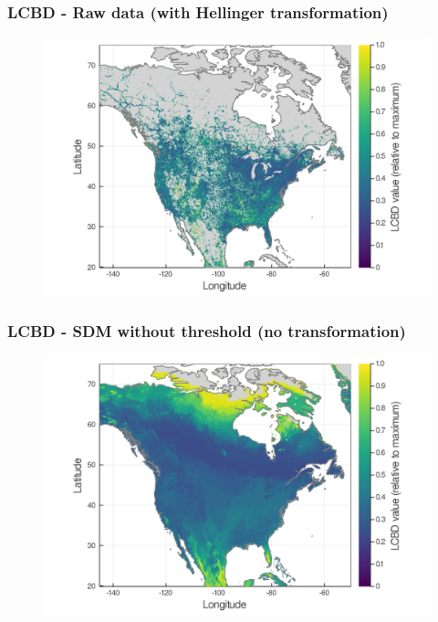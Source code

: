 \documentclass[10pt]{beamer}
\begin{document}
\begin{frame}
  \frametitle{LCBD - Raw data (with Hellinger transformation)}
  \begin{figure}
    \centering
    \hspace*{-0cm}\includegraphics[scale=0.17]{fig/05_raw_lcbd-transf.png}
  \end{figure}
\end{frame}

\begin{frame}
  \frametitle{LCBD - SDM without threshold (no transformation)}
  \begin{figure}
    \centering
    \hspace*{-0cm}\includegraphics[scale=0.17]{fig/05_sdm_lcbd.png}
  \end{figure}
\end{frame}
\end{document}
